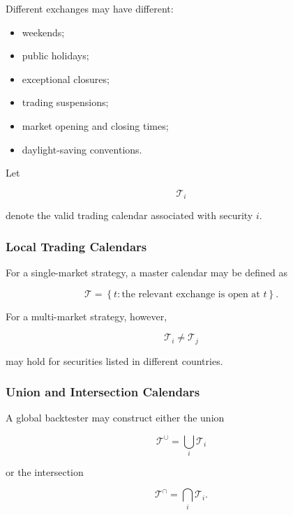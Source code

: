 \documentclass[11pt,a4paper]{article}
\begin{document}
Different exchanges may have different:

\begin{itemize}
    \item weekends;
    \item public holidays;
    \item exceptional closures;
    \item trading suspensions;
    \item market opening and closing times;
    \item daylight-saving conventions.
\end{itemize}

Let

\begin{equation}
\mathcal{T}_i
\end{equation}

denote the valid trading calendar associated with security $i$.


\subsubsection{Local Trading Calendars}

For a single-market strategy, a master calendar may be defined as

\begin{equation}
\mathcal{T}
=
\left\{
t:
\text{the relevant exchange is open at }t
\right\}.
\end{equation}

For a multi-market strategy, however,

\begin{equation}
\mathcal{T}_i
\neq
\mathcal{T}_j
\end{equation}

may hold for securities listed in different countries.


\subsubsection{Union and Intersection Calendars}

A global backtester may construct either the union

\begin{equation}
\mathcal{T}^{\cup}
=
\bigcup_i
\mathcal{T}_i
\end{equation}

or the intersection

\begin{equation}
\mathcal{T}^{\cap}
=
\bigcap_i
\mathcal{T}_i.
\end{equation}
\end{document}
